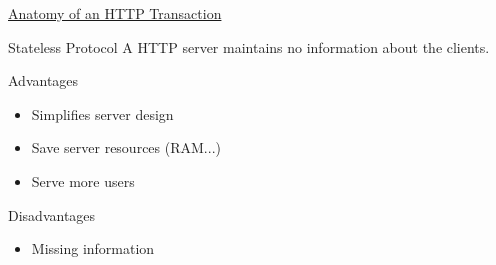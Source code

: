\href{http://blog.catchpoint.com/2010/09/17/anatomyhttp/}{Anatomy of an HTTP Transaction}

\begin{frame}{Stateless Protocol}
  A HTTP server maintains no information about the clients.
  \begin{iblock}{Advantages}
    \begin{itemize}
    \item Simplifies server design
    \item Save server resources (RAM...)
    \item Serve more users
    \end{itemize}
  \end{iblock}
  \begin{iblock}{Disadvantages}
    \begin{itemize}
    \item Missing information
    \end{itemize}
  \end{iblock}
\end{frame}

